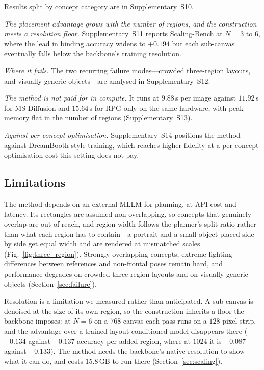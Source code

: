 \documentclass[review,10pt,times]{elsarticle}
\begin{document}
Results split by concept category are in Supplementary~S10.


\noindent\textit{The placement advantage grows with the number of
regions, and the construction meets a resolution floor.}
Supplementary~S11 reports Scaling-Bench at $N{=}3$ to $6$, where the lead in
binding accuracy widens to $+0.194$ but each sub-canvas eventually falls below
the backbone's training resolution.


\noindent\textit{Where it fails.}
The two recurring failure modes---crowded three-region layouts, and visually
generic objects---are analysed in Supplementary~S12.


\noindent\textit{The method is not paid for in compute.}
It runs at $9.88$\,s per image against $11.92$\,s for MS-Diffusion and
$15.64$\,s for RPG-only on the same hardware, with peak memory flat in the
number of regions (Supplementary~S13).


\noindent\textit{Against per-concept optimisation.}
Supplementary~S14 positions the method against DreamBooth-style training,
which reaches higher fidelity at a per-concept optimisation cost this setting
does not pay.


\subsection{Limitations}
\label{sec:limitations}

The method depends on an external MLLM for planning, at API cost and
latency.  Its rectangles are assumed non-overlapping, so concepts that
genuinely overlap are out of reach, and region width follows the planner's
split ratio rather than what each region has to contain---a portrait and a
small object placed side by side get equal width and are rendered at
mismatched scales (Fig.~\ref{fig:three_region}).  Strongly overlapping
concepts, extreme lighting differences between references and non-frontal
poses remain hard, and performance degrades on crowded three-region layouts
and on visually generic objects (Section~\ref{sec:failure}).

Resolution is a limitation we measured rather than anticipated.  A sub-canvas
is denoised at the size of its own region, so the construction inherits a
floor the backbone imposes: at $N{=}6$ on a $768$ canvas each pass runs on a
$128$-pixel strip, and the advantage over a trained layout-conditioned model
disappears there ($-0.134$ against $-0.137$ accuracy per added region, where
at $1024$ it is $-0.087$ against $-0.133$).  The method needs the backbone's
native resolution to show what it can do, and costs $15.8$\,GB to run there
(Section~\ref{sec:scaling}).
\end{document}
